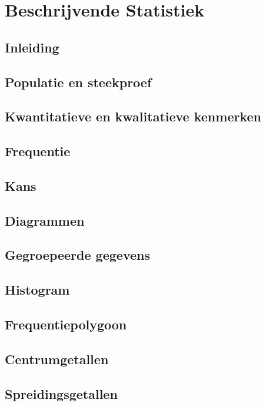 \documentclass[11pt]{article}
\begin{document}
\section{Beschrijvende Statistiek}

\subsection{Inleiding}

\subsection{Populatie en steekproef}

\subsection{Kwantitatieve en kwalitatieve kenmerken}

\subsection{Frequentie}

\subsection{Kans}

\subsection{Diagrammen}

\subsection{Gegroepeerde gegevens}

\subsection{Histogram}

\subsection{Frequentiepolygoon}

\subsection{Centrumgetallen}

\subsection{Spreidingsgetallen}
\end{document}
